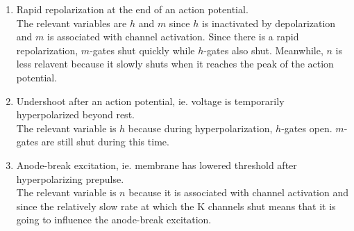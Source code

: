 \documentclass[11pt]{article}
\begin{document}
\begin{enumerate}[label=\arabic*.]
\begin{enumerate}[label=(\alph*)]
\item
Rapid repolarization at the end of an action potential.
\vspace*{1\baselineskip}
\\
The relevant variables are $h$ and $m$ since $h$ is inactivated by depolarization and $m$ is associated with  channel activation. Since there is a rapid repolarization, $m$-gates shut quickly while $h$-gates also shut. Meanwhile, $n$ is less relavent because it slowly shuts when it reaches the peak of the action potential.
\\



\item
Undershoot after an action potential, ie. voltage is temporarily hyperpolarized beyond rest.
\vspace*{1\baselineskip}
\\
The relevant variable is $h$ because during hyperpolarization, $h$-gates open. $m$-gates are still shut during this time.
\\



\item
Anode-break excitation, ie. membrane has lowered threshold after hyperpolarizing prepulse.
\vspace*{1\baselineskip}
\\
The relevant variable is $n$ because it is associated with  channel activation and since the relatively slow rate at which the K channels shut means that it is going to influence the anode-break excitation.
\\
\end{enumerate}




\end{enumerate}
\end{document}
